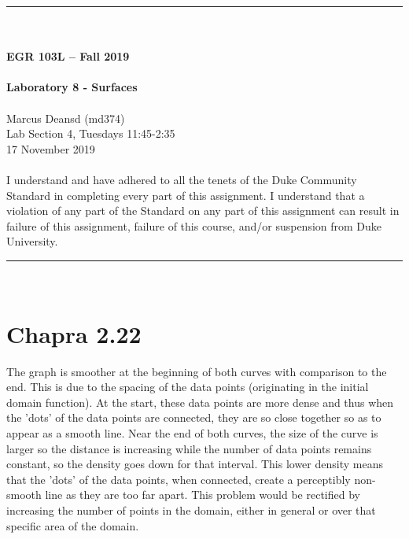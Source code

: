 \documentclass{article}
\begin{document}
\begin{center}
\rule{6.5in}{0.5mm}\\~\\
\textbf{\large EGR 103L -- Fall 2019}\\~\\
\textbf{\huge Laboratory 8 - Surfaces}\\~\\
Marcus Deansd (md374)\\
Lab Section 4, Tuesdays 11:45-2:35\\
17 November 2019\\~\\
{\small I understand and have adhered to all the tenets of the Duke
  Community Standard in completing every part of this assignment.  I
  understand that a violation of any part of the Standard on any part
  of this assignment can result in failure of this assignment, failure
  of this course, and/or suspension from Duke University.} 
\rule{6.5in}{0.5mm}\\
\end{center}
\tableofcontents
\listoffigures
\renewcommand{\arraystretch}{1.5}
\clearpage

\section{Chapra 2.22}
The graph is smoother at the beginning of both curves with comparison to the end. This is due to the spacing of the data points (originating in the initial domain function). At the start, these data points are more dense and thus when the 'dots' of the data points are connected, they are so close together so as to appear as a smooth line. Near the end of both curves, the size of the  curve is larger so the distance is increasing while the number of data points remains constant, so the density goes down for that interval. This lower density means that the 'dots' of the data points, when connected, create a perceptibly non-smooth line as they are too far apart. This problem would be rectified by increasing the number of points in the domain, either in general or over that specific area of the domain. 
\end{document}
